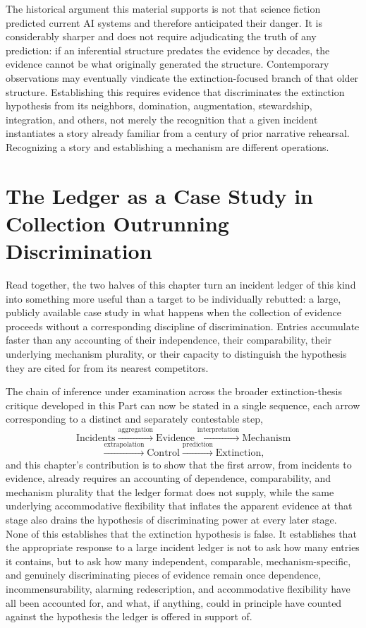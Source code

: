 The historical argument this material supports is not that science fiction predicted current AI systems and therefore anticipated their danger. It is considerably sharper and does not require adjudicating the truth of any prediction: if an inferential structure predates the evidence by decades, the evidence cannot be what originally generated the structure. Contemporary observations may eventually vindicate the extinction-focused branch of that older structure. Establishing this requires evidence that discriminates the extinction hypothesis from its neighbors, domination, augmentation, stewardship, integration, and others, not merely the recognition that a given incident instantiates a story already familiar from a century of prior narrative rehearsal. Recognizing a story and establishing a mechanism are different operations.

\section{The Ledger as a Case Study in Collection Outrunning Discrimination}

Read together, the two halves of this chapter turn an incident ledger of this kind into something more useful than a target to be individually rebutted: a large, publicly available case study in what happens when the collection of evidence proceeds without a corresponding discipline of discrimination. Entries accumulate faster than any accounting of their independence, their comparability, their underlying mechanism plurality, or their capacity to distinguish the hypothesis they are cited for from its nearest competitors.

The chain of inference under examination across the broader extinction-thesis critique developed in this Part can now be stated in a single sequence, each arrow corresponding to a distinct and separately contestable step,
\[
\text{Incidents} \xrightarrow{\text{aggregation}} \text{Evidence} \xrightarrow{\text{interpretation}} \text{Mechanism}
\]
\[
\xrightarrow{\text{extrapolation}} \text{Control} \xrightarrow{\text{prediction}} \text{Extinction},
\]
and this chapter's contribution is to show that the first arrow, from incidents to evidence, already requires an accounting of dependence, comparability, and mechanism plurality that the ledger format does not supply, while the same underlying accommodative flexibility that inflates the apparent evidence at that stage also drains the hypothesis of discriminating power at every later stage. None of this establishes that the extinction hypothesis is false. It establishes that the appropriate response to a large incident ledger is not to ask how many entries it contains, but to ask how many independent, comparable, mechanism-specific, and genuinely discriminating pieces of evidence remain once dependence, incommensurability, alarming redescription, and accommodative flexibility have all been accounted for, and what, if anything, could in principle have counted against the hypothesis the ledger is offered in support of.
